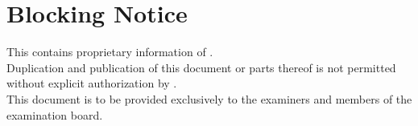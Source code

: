 

\chapter*{Blocking Notice}

This \cfgTyp contains proprietary information of \cfgCompany. \\
Duplication and publication of this document or parts thereof is not permitted without explicit authorization by \cfgCompany. \\
This document is to be provided exclusively to the examiners and members of the examination board.
